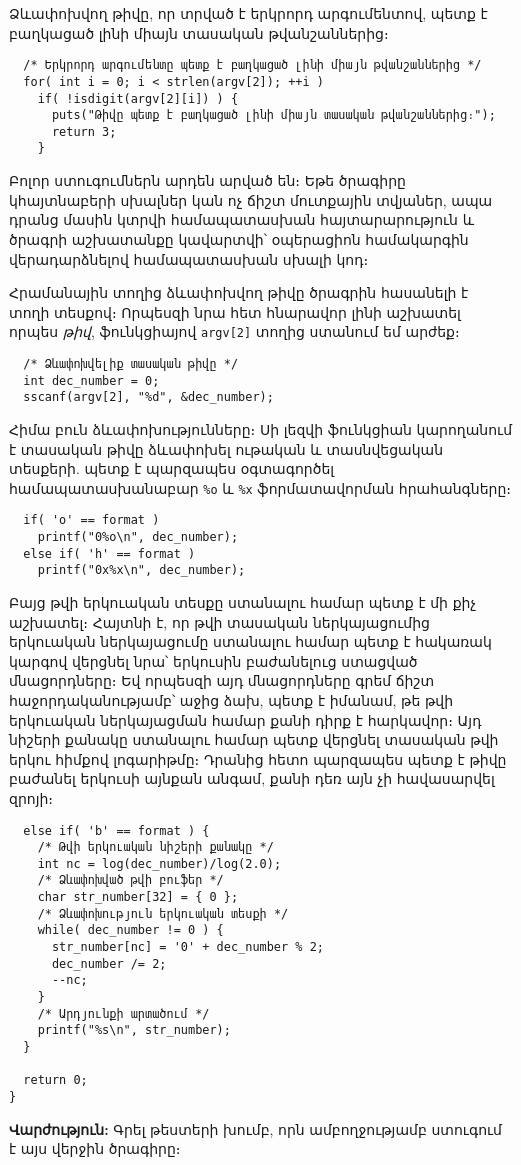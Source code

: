 Ձևափոխվող թիվը, որ տրված է երկրորդ արգումենտով, պետք է
բաղկացած լինի միայն տասական թվանշաններից։

\begin{Verbatim}
  /* Երկրորդ արգումենտը պետք է բաղկացած լինի միայն թվանշաններից */
  for( int i = 0; i < strlen(argv[2]); ++i )
    if( !isdigit(argv[2][i]) ) {
      puts("Թիվը պետք է բաղկացած լինի միայն տասական թվանշաններից։");
      return 3;
    }
\end{Verbatim}

Բոլոր ստուգումներն արդեն արված են։ Եթե ծրագիրը կհայտնաբերի
սխալներ կան ոչ ճիշտ մուտքային տվյաներ, ապա դրանց մասին կտրվի
համապատասխան հայտարարություն և ծրագրի աշխատանքը կավարտվի՝
օպերացիոն համակարգին վերադարձնելով համապատասխան սխալի կոդ։

Հրամանային տողից ձևափոխվող թիվը ծրագրին հասանելի է տողի
տեսքով։ Որպեսզի նրա հետ հնարավոր լինի աշխատել որպես
\emph{թիվ},  ֆունկցիայով \Verb|argv[2]| տողից
ստանում եմ  արժեք։

\begin{Verbatim}
  /* Ձևափոխվելիք տասական թիվը */
  int dec_number = 0;
  sscanf(argv[2], "%d", &dec_number);
\end{Verbatim}

Հիմա բուն ձևափոխությունները։ Սի լեզվի  ֆունկցիան
կարողանում է տասական թիվը ձևափոխել ութական և տասնվեցական տեսքերի.
պետք է պարզապես օգտագործել համապատասխանաբար \Verb|%
ֆորմատավորման հրահանգները։

\begin{Verbatim}
  if( 'o' == format )
    printf("0%o\n", dec_number);
  else if( 'h' == format )
    printf("0x%x\n", dec_number);
\end{Verbatim}

Բայց թվի երկուական տեսքը ստանալու համար պետք է մի քիչ աշխատել։
Հայտնի է, որ թվի տասական ներկայացումից երկուական ներկայացումը
ստանալու համար պետք է հակառակ կարգով վերցնել նրա՝ երկուսին
բաժանելուց ստացված մնացորդները։ Եվ որպեսզի այդ մնացորդները
գրեմ ճիշտ հաջորդականությամբ՝ աջից ձախ, պետք է իմանամ, թե թվի
երկուական ներկայացման համար քանի դիրք է հարկավոր։ Այդ նիշերի
քանակը ստանալու համար պետք վերցնել տասական թվի երկու հիմքով
լոգարիթմը։ Դրանից հետո պարզապես պետք է 
թիվը բաժանել երկուսի այնքան անգամ, քանի դեռ այն չի հավասարվել
զրոյի։

\begin{Verbatim}
  else if( 'b' == format ) {
    /* Թվի երկուական նիշերի քանակը */
    int nc = log(dec_number)/log(2.0);
    /* Ձևափոխված թվի բուֆեր */
    char str_number[32] = { 0 };
    /* Ձևափոխություն երկուական տեսքի */
    while( dec_number != 0 ) {
      str_number[nc] = '0' + dec_number % 2;
      dec_number /= 2;
      --nc;
    }
    /* Արդյունքի արտածում */
    printf("%s\n", str_number);
  }

  return 0;
}
\end{Verbatim}

\textbf{Վարժություն:} Գրել թեստերի խումբ, որն ամբողջությամբ
ստուգում է այս վերջին ծրագիրը։
